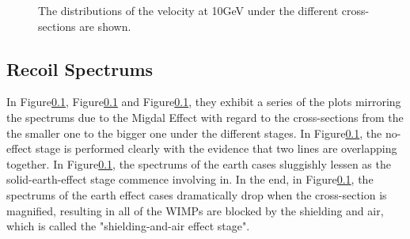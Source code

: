 \begin{figure}[]
\captionsetup[subfigure]{}
\centering


\caption{The distributions of the velocity at 10GeV under the different cross-sections are shown. }\label{}
\end{figure}

\subsection{Recoil Spectrums}
In Figure\ref{}, Figure\ref{} and Figure\ref{}, they exhibit a series of the plots mirroring the
spectrums due to the Migdal Effect with regard to the cross-sections from the
the smaller one to the bigger one under the different stages. 
In Figure\ref{}, the no-effect stage is performed clearly with the evidence that two lines are overlapping together. 
In Figure\ref{}, the spectrums of the earth cases sluggishly lessen as the solid-earth-effect stage commence involving in. In the end, in Figure\ref{}, the spectrums of the earth effect cases dramatically drop when the cross-section is magnified, resulting in all of the WIMPs are blocked by the shielding and air, which is called the "shielding-and-air effect stage".

